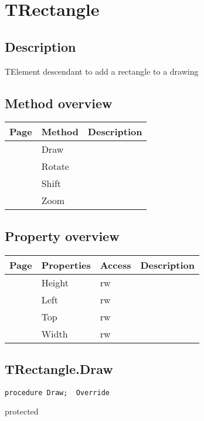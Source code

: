 \section{TRectangle}
\label{hmi:drawncontrol:trectangle}
\subsection{Description}
TElement descendant to add a rectangle to a drawing%
\subsection{Method overview}
\label{hmi:drawncontrol:trectangle:methods}
\begin{tabularx}{\textwidth}{llX}
Page & Method & Description  \\ \hline
\pageref{hmi:drawncontrol:trectangle:draw} & Draw  &  \\
\pageref{hmi:drawncontrol:trectangle:rotate} & Rotate  &  \\
\pageref{hmi:drawncontrol:trectangle:shift} & Shift  &  \\
\pageref{hmi:drawncontrol:trectangle:zoom} & Zoom  &  \\
\hline
\end{tabularx}
\subsection{Property overview}
\label{hmi:drawncontrol:trectangle:properties}
\begin{tabularx}{\textwidth}{lllX}
Page & Properties & Access & Description \\ \hline
\pageref{hmi:drawncontrol:trectangle:height} & Height & rw &  \\
\pageref{hmi:drawncontrol:trectangle:left} & Left & rw &  \\
\pageref{hmi:drawncontrol:trectangle:top} & Top & rw &  \\
\pageref{hmi:drawncontrol:trectangle:width} & Width & rw &  \\
\hline
\end{tabularx}
\subsection{TRectangle.Draw}
\label{hmi:drawncontrol:trectangle:draw}
\begin{FPCList}
\Declaration 

\begin{verbatim}
procedure Draw;  Override
\end{verbatim}
\Visibility
protected
\end{FPCList}
